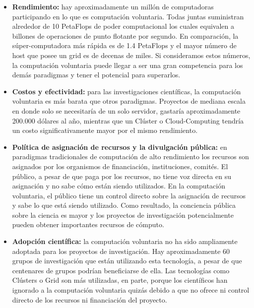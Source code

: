 \begin{itemize}

 \item \textbf{Rendimiento:} hay aproximadamente un millón de computadoras participando en lo que es computación voluntaria. 
			      Todas juntas suministran alrededor de 10 PetaFlops de poder computacional los cuales equivalen a billones de operaciones
			      de punto flotante por segundo. En comparación, la súper-computadora más rápida es de 1.4 PetaFlops y el mayor número de host 
			      que posee un grid es de decenas de miles. Si consideramos estos números, la computación voluntaria puede llegar a ser una
			      gran competencia para los demás paradigmas y tener el potencial para superarlos.

 \item \textbf{Costos y efectividad:} para las investigaciones científicas, la computación voluntaria es más barata que otros paradigmas. 
				      Proyectos de mediana escala en donde solo se necesitaría de un solo servidor,
				      gastaría aproximadamente 200.000 dólares al año,
				      mientras que un Clúster o Cloud-Computing tendría un costo significativamente mayor por el mismo rendimiento.

 \item \textbf{Política de asignación de recursos y la divulgación pública:} en paradigmas tradicionales de computación de alto rendimiento los
									    recursos son asignados por los organismos de financiación, instituciones,
									    comités. El público, a pesar de que paga por
									    los recursos, no tiene voz directa en su asignación y no sabe cómo están 
									    siendo utilizados. En la computación voluntaria, 
									    el público tiene un control directo sobre la asignación de recursos y sabe
									    lo que está siendo utilizado. Como resultado,
									    la conciencia pública sobre la ciencia es mayor y los proyectos de investigación
									    potencialmente pueden obtener importantes recursos de cómputo.

 \item \textbf{Adopción científica:} la computación voluntaria no ha sido ampliamente adoptada para los proyectos de investigación. 
				      Hay aproximadamente 60 grupos de investigación que están utilizando esta tecnología, a pesar de que centenares de grupos podrían 
				      beneficiarse de ella. Las tecnologías como Clústers o Grid son más utilizadas, en parte, porque los científicos han ignorado
				      a la computación voluntaria quizás debido a que no ofrece ni control directo de los recursos ni financiación del proyecto.
 
\end{itemize}

